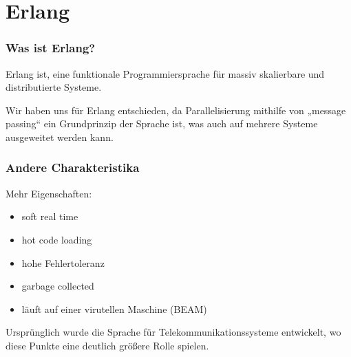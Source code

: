 \documentclass[compress]{beamer}
\begin{document}

\section{Erlang}
\label{sec:erlang}

\begin{frame}
  \frametitle{Was ist Erlang?}

  Erlang ist, eine funktionale Programmiersprache für massiv
  skalierbare und distributierte Systeme.

  Wir haben uns für Erlang entschieden, da Parallelisierung mithilfe
  von „message passing“ ein Grundprinzip der Sprache ist, was auch auf
  mehrere Systeme ausgeweitet werden kann.
\end{frame}

\begin{frame}
  \frametitle{Andere Charakteristika}

  Mehr Eigenschaften:

  \begin{itemize}
  \item soft real time
  \item hot code loading
  \item hohe Fehlertoleranz
  \item garbage collected
  \item läuft auf einer virutellen Maschine (BEAM)
  \end{itemize}

  Ursprünglich wurde die Sprache für Telekommunikationssysteme
  entwickelt, wo diese Punkte eine deutlich größere Rolle spielen.
\end{frame}
\end{document}
